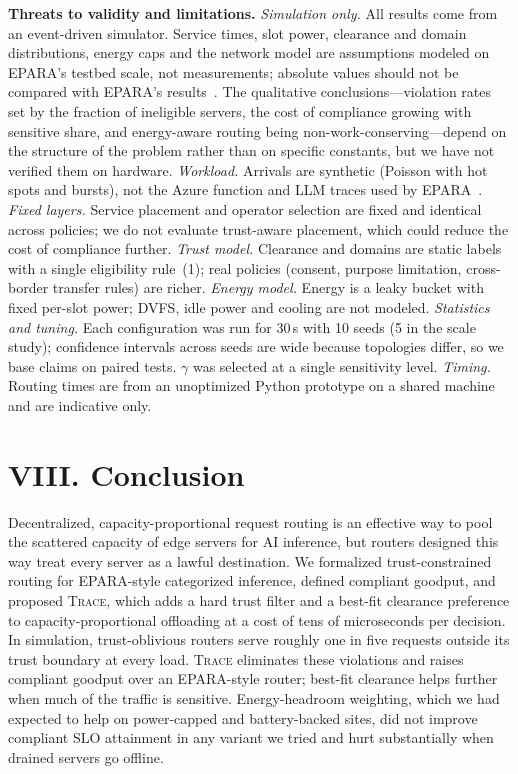 \documentclass{article}
\newcommand{\sys}{\textsc{Trace}}
\begin{document}
\textbf{Threats to validity and limitations.}
\emph{Simulation only.} All results come from an event-driven simulator. Service times, slot power, clearance and domain distributions, energy caps and the network model are assumptions modeled on EPARA's testbed scale, not measurements; absolute values should not be compared with EPARA's results~\cite{epara2025}. The qualitative conclusions---violation rates set by the fraction of ineligible servers, the cost of compliance growing with sensitive share, and energy-aware routing being non-work-conserving---depend on the structure of the problem rather than on specific constants, but we have not verified them on hardware.
\emph{Workload.} Arrivals are synthetic (Poisson with hot spots and bursts), not the Azure function and LLM traces used by EPARA~\cite{shahrad2020serverless,epara2025}.
\emph{Fixed layers.} Service placement and operator selection are fixed and identical across policies; we do not evaluate trust-aware placement, which could reduce the cost of compliance further.
\emph{Trust model.} Clearance and domains are static labels with a single eligibility rule~(1); real policies (consent, purpose limitation, cross-border transfer rules) are richer.
\emph{Energy model.} Energy is a leaky bucket with fixed per-slot power; DVFS, idle power and cooling are not modeled.
\emph{Statistics and tuning.} Each configuration was run for 30\,s with 10 seeds (5 in the scale study); confidence intervals across seeds are wide because topologies differ, so we base claims on paired tests. $\gamma$ was selected at a single sensitivity level.
\emph{Timing.} Routing times are from an unoptimized Python prototype on a shared machine and are indicative only.

\section*{VIII. Conclusion}

Decentralized, capacity-proportional request routing is an effective way to pool the scattered capacity of edge servers for AI inference, but routers designed this way treat every server as a lawful destination. We formalized trust-constrained routing for EPARA-style categorized inference, defined compliant goodput, and proposed \sys{}, which adds a hard trust filter and a best-fit clearance preference to capacity-proportional offloading at a cost of tens of microseconds per decision. In simulation, trust-oblivious routers serve roughly one in five requests outside its trust boundary at every load. \sys{} eliminates these violations and raises compliant goodput over an EPARA-style router; best-fit clearance helps further when much of the traffic is sensitive. Energy-headroom weighting, which we had expected to help on power-capped and battery-backed sites, did not improve compliant SLO attainment in any variant we tried and hurt substantially when drained servers go offline.
\end{document}
